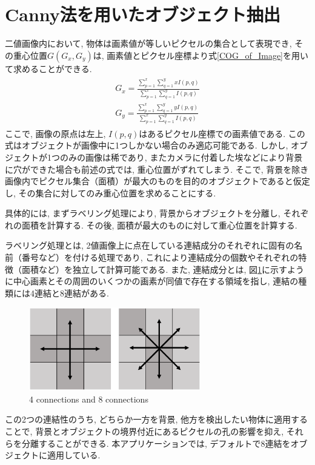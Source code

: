 \documentclass{suribt}
\begin{document}
\section{Canny法を用いたオブジェクト抽出}
二値画像内において, 物体は画素値が等しいピクセルの集合として表現でき, その重心位置$G(G_x, G_y)$は, 画素値とピクセル座標より式\ref{COG_of_Image}を用いて求めることができる.
\begin{align}
	\begin{aligned}
		\label{COG_of_Image}
		G_x = \frac{\sum_{p=1}^x \sum_{q=1}^y xI(p, q)}{\sum_{p=1}^x \sum_{q=1}^y I(p, q)}\\
		G_y = \frac{\sum_{p=1}^x \sum_{q=1}^y yI(p, q)}{\sum_{p=1}^x \sum_{q=1}^y I(p, q)}
	\end{aligned}
\end{align}
ここで, 画像の原点は左上, $I(p, q)$はあるピクセル座標での画素値である. 
この式はオブジェクトが画像中に1つしかない場合のみ適応可能である. しかし, オブジェクトが1つのみの画像は稀であり, またカメラに付着した埃などにより背景に穴ができた場合も前述の式では, 重心位置がずれてしまう.
そこで, 背景を除き画像内でピクセル集合（面積）が最大のものを目的のオブジェクトであると仮定し, その集合に対してのみ重心位置を求めることにする. 

具体的には, まずラベリング処理により, 背景からオブジェクトを分離し, それぞれの面積を計算する. その後, 面積が最大のものに対して重心位置を計算する. 

ラベリング処理とは, 2値画像上に点在している連結成分のそれぞれに固有の名前（番号など）を付ける処理であり, これにより連結成分の個数やそれぞれの特徴（面積など）を独立して計算可能である. また, 連結成分とは, 図\ref{fig:4conne_and_8conne}に示すように中心画素とその周囲のいくつかの画素が同値で存在する領域を指し, 連結の種類には4連結と8連結がある. 
\begin{figure}[ht]
	\begin{center}
		\includegraphics[width=75mm,clip]{./figure/gazou.eps}
		\caption{4 connections and 8 connections}
		\label{fig:4conne_and_8conne}
	\end{center}
\end{figure}
この2つの連結性のうち, どちらか一方を背景, 他方を検出したい物体に適用することで, 背景とオブジェクトの境界付近にあるピクセルの孔の影響を抑え, それらを分離することができる. 本アプリケーションでは, デフォルトで8連結をオブジェクトに適用している. 
\end{document}
